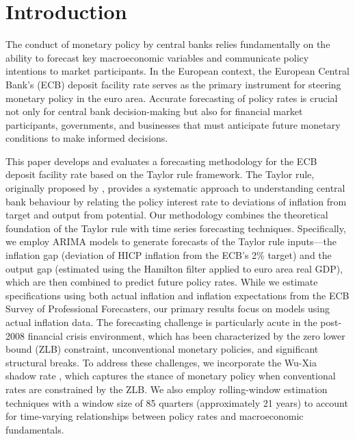 \clearpage
\section{Introduction}\label{sec:intro}
\par The conduct of monetary policy by central banks relies fundamentally on the ability to forecast key macroeconomic variables and communicate policy intentions to market participants. In the European context, the European Central Bank's (ECB) deposit facility rate serves as the primary instrument for steering monetary policy in the euro area. Accurate forecasting of policy rates is crucial not only for central bank decision-making but also for financial market participants, governments, and businesses that must anticipate future monetary conditions to make informed decisions.
\par This paper develops and evaluates a forecasting methodology for the ECB deposit facility rate based on the Taylor rule framework. The Taylor rule, originally proposed by \cite{taylor1993discretion}, provides a systematic approach to understanding central bank behaviour by relating the policy interest rate to deviations of inflation from target and output from potential. Our methodology combines the theoretical foundation of the Taylor rule with time series forecasting techniques. Specifically, we employ ARIMA models to generate forecasts of the Taylor rule inputs—the inflation gap (deviation of HICP inflation from the ECB's 2\% target) and the output gap (estimated using the Hamilton filter applied to euro area real GDP), which are then combined to predict future policy rates. While we estimate specifications using both actual inflation and inflation expectations from the ECB Survey of Professional Forecasters, our primary results focus on models using actual inflation data. The forecasting challenge is particularly acute in the post-2008 financial crisis environment, which has been characterized by the zero lower bound (ZLB) constraint, unconventional monetary policies, and significant structural breaks. To address these challenges, we incorporate the Wu-Xia shadow rate \citep{wu2016measuring}, which captures the stance of monetary policy when conventional rates are constrained by the ZLB. We also employ rolling-window estimation techniques with a window size of 85 quarters (approximately 21 years) to account for time-varying relationships between policy rates and macroeconomic fundamentals.
